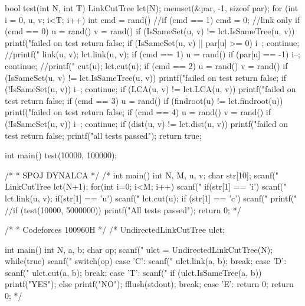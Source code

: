 \documentclass[11pt]{article}
\begin{document}
\begin{vncode}
bool test(int N, int T) {
	LinkCutTree lct(N);
	memset(&par, -1, sizeof par);
	for (int i = 0, u, v; i<T; i++) {
		int cmd = rand() %
		//if (cmd == 1) cmd = 0; //link only
		if (cmd == 0) {
			u = rand() %
			v = rand() %
			if (IsSameSet(u, v) != lct.IsSameTree(u, v)) {
				printf("failed on test %
				return false;
			}
			if (IsSameSet(u, v) || par[u] >= 0) {
				i--;
				continue;
			}
			//printf("%
			link(u, v);
			lct.link(u, v);
		}
		if (cmd == 1) {
			u = rand() %
			if (par[u] == -1) {
				i--;
				continue;
			}
			//printf("%
			cut(u);
			lct.cut(u);
		}
		if (cmd == 2) {
			u = rand() %
			v = rand() %
			if (IsSameSet(u, v) != lct.IsSameTree(u, v)) {
				printf("failed on test %
				return false;
			}
			if (!IsSameSet(u, v)) {
				i--;
				continue;
			}
			if (LCA(u, v) != lct.LCA(u, v)) {
				printf("failed on test %
				return false;
			}
		}
		if (cmd == 3) {
			u = rand() %
			if (findroot(u) != lct.findroot(u)) {
				printf("failed on test %
				return false;
			}
		}
		if (cmd == 4) {
			u = rand() %
			v = rand() %
			if (!IsSameSet(u, v)) {
				i--;
				continue;
			}
			if (dist(u, v) != lct.dist(u, v)) {
				printf("failed on test %
				return false;
			}
		}
	}
	printf("all tests passed\n");
	return true;
}

int main() {
	test(10000, 100000);
}

/*
 * SPOJ DYNALCA
 */
/*
int main() {
	int N, M, u, v;
	char str[10];
	scanf("%
	LinkCutTree lct(N+1);
	for(int i=0; i<M; i++) {
		scanf(" %
		if(str[1] == 'i') {
			scanf("%
			lct.link(u, v);
		}
		if(str[1] == 'u') {
			scanf("%
			lct.cut(u);
		}
		if (str[1] == 'c') {
			scanf("%
			printf("%
		}
	}
	//if (test(10000, 5000000)) printf("All tests passed\n");
	return 0;
}*/

/*
 * Codeforces 100960H
 */
/*
UndirectedLinkCutTree ulct;

int main() {
	int N, a, b;
	char op;
	scanf("%
	ulct = UndirectedLinkCutTree(N);
	while(true) {
		scanf(" %
		switch(op) {
		case 'C':
			scanf("%
			ulct.link(a, b);
			break;
		case 'D':
			scanf("%
			ulct.cut(a, b);
			break;
		case 'T':
			scanf("%
			if (ulct.IsSameTree(a, b)) printf("YES\n");
			else printf("NO\n");
			fflush(stdout);
			break;
		case 'E':
			return 0;
		}
	}
	return 0;
}*/
\end{vncode}
\endgroup
\end{document}
